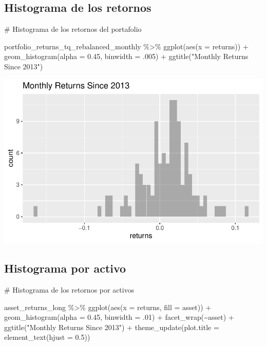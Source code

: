 \documentclass[
  letterpaper,
  DIV=11,
  numbers=noendperiod]{scrartcl}
\newenvironment{Shaded}{\begin{snugshade}}{\end{snugshade}}
\newcommand{\AttributeTok}[1]{\textcolor[rgb]{0.40,0.45,0.13}{#1}}
\newcommand{\CommentTok}[1]{\textcolor[rgb]{0.37,0.37,0.37}{#1}}
\newcommand{\DecValTok}[1]{\textcolor[rgb]{0.68,0.00,0.00}{#1}}
\newcommand{\FloatTok}[1]{\textcolor[rgb]{0.68,0.00,0.00}{#1}}
\newcommand{\FunctionTok}[1]{\textcolor[rgb]{0.28,0.35,0.67}{#1}}
\newcommand{\NormalTok}[1]{\textcolor[rgb]{0.00,0.23,0.31}{#1}}
\newcommand{\SpecialCharTok}[1]{\textcolor[rgb]{0.37,0.37,0.37}{#1}}
\newcommand{\StringTok}[1]{\textcolor[rgb]{0.13,0.47,0.30}{#1}}
\begin{document}
\subsection{Histograma de los
retornos}\label{histograma-de-los-retornos}

\begin{Shaded}
\begin{Highlighting}[]
\CommentTok{\# Histograma de los retornos del portafolio}

\NormalTok{portfolio\_returns\_tq\_rebalanced\_monthly }\SpecialCharTok{\%\textgreater{}\%}
  \FunctionTok{ggplot}\NormalTok{(}\FunctionTok{aes}\NormalTok{(}\AttributeTok{x =}\NormalTok{ returns)) }\SpecialCharTok{+}
  \FunctionTok{geom\_histogram}\NormalTok{(}\AttributeTok{alpha =} \FloatTok{0.45}\NormalTok{, }\AttributeTok{binwidth =}\NormalTok{ .}\DecValTok{005}\NormalTok{) }\SpecialCharTok{+}
  \FunctionTok{ggtitle}\NormalTok{(}\StringTok{"Monthly Returns Since 2013"}\NormalTok{)}
\end{Highlighting}
\end{Shaded}

\includegraphics[width=0.5\linewidth,height=\textheight,keepaspectratio]{notebook_optimization_test_files/figure-pdf/unnamed-chunk-13-1.pdf}

\subsection{Histograma por activo}\label{histograma-por-activo}

\begin{Shaded}
\begin{Highlighting}[]
\CommentTok{\# Histograma de los retornos por activos}

\NormalTok{asset\_returns\_long }\SpecialCharTok{\%\textgreater{}\%}
  \FunctionTok{ggplot}\NormalTok{(}\FunctionTok{aes}\NormalTok{(}\AttributeTok{x =}\NormalTok{ returns, }\AttributeTok{fill =}\NormalTok{ asset)) }\SpecialCharTok{+}
  \FunctionTok{geom\_histogram}\NormalTok{(}\AttributeTok{alpha =} \FloatTok{0.45}\NormalTok{, }\AttributeTok{binwidth =}\NormalTok{ .}\DecValTok{01}\NormalTok{) }\SpecialCharTok{+} 
  \FunctionTok{facet\_wrap}\NormalTok{(}\SpecialCharTok{\textasciitilde{}}\NormalTok{asset) }\SpecialCharTok{+}
  \FunctionTok{ggtitle}\NormalTok{(}\StringTok{"Monthly Returns Since 2013"}\NormalTok{) }\SpecialCharTok{+}
  \FunctionTok{theme\_update}\NormalTok{(}\AttributeTok{plot.title =} \FunctionTok{element\_text}\NormalTok{(}\AttributeTok{hjust =} \FloatTok{0.5}\NormalTok{))}
\end{Highlighting}
\end{Shaded}
\end{document}
